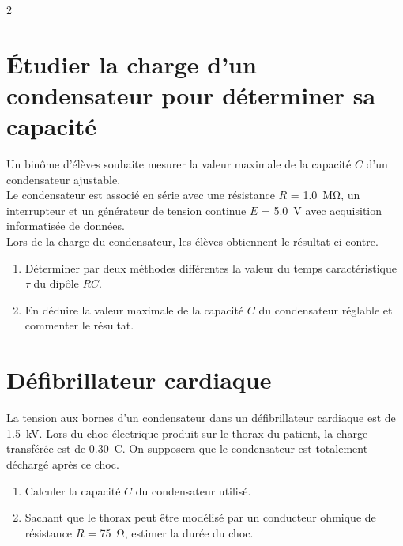 \documentclass[a4paper,11pt,fleqn]{scrartcl}%
\begin{document}
\begin{multicols}{2}
\section{Étudier la charge d'un condensateur pour déterminer sa capacité}
Un binôme d'élèves souhaite mesurer la valeur maximale de la capacité $C$ d'un condensateur ajustable.\\
Le condensateur est associé en série avec une résistance $R$ = \SI{1,0}{\mega\ohm}, un interrupteur et un générateur de tension continue $E$ = \SI{5,0}{\volt} avec acquisition informatisée de données.\\
Lors de la charge du condensateur, les élèves obtiennent le résultat ci-contre.
\begin{center}%
\end{center}
\begin{enumerate}
	\item Déterminer par deux méthodes différentes la valeur du temps caractéristique $\tau$ du dipôle $RC$.
	\item En déduire la valeur maximale de la capacité $C$ du condensateur réglable et commenter le résultat.
\end{enumerate}

\section{Défibrillateur cardiaque}
La tension aux bornes d'un condensateur dans un défibrillateur cardiaque est de \SI{1,5}{\kilo\volt}. Lors du choc électrique produit sur le thorax du patient, la charge transférée est de \SI{0,30}{\coulomb}. On supposera que le condensateur est totalement déchargé après ce choc.
\begin{enumerate}
	\item Calculer la capacité $C$ du condensateur utilisé.
	\item Sachant que le thorax peut être modélisé par un conducteur ohmique de résistance $R$ = \SI{75}{\ohm}, estimer la durée du choc.
\end{enumerate}


\end{multicols}
\end{document}
